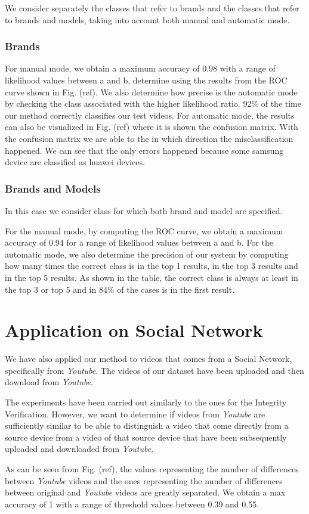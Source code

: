 We consider separately the classes that refer to brands and the classes that refer to brands and models, taking into account both manual and automatic mode.

\subsubsection*{Brands}

For manual mode, we obtain a maximum accuracy of 0.98 with a range of likelihood values between a and b, determine using the results from the ROC curve shown in Fig. (ref).
We also determine how precise is the automatic mode by checking the class associated with the higher likelihood ratio. 92\% of the time our method correctly classifies our test videos. For automatic mode, the results can also be visualized in Fig. (ref) where it is shown the confusion matrix. With the confusion matrix we are able to the in which direction the misclassification happened. We can see that the only errors happened because some samsung device are classified as huawei devices. 

\subsubsection*{Brands and Models}

In this case we consider class for which both brand and model are specified. 

For the manual mode, by computing the ROC curve, we obtain a maximum accuracy of 0.94 for a range of likelihood values between a and b.
For the automatic mode, we also determine the precision of our system by computing how many times the correct class is in the top 1 results, in the top 3 results and in the top 5 results. As shown in the table, the correct class is always at least in the top 3 or top 5 and in 84\% of the cases is in the first result.

\section{Application on Social Network}

We have also applied our method to videos that comes from a Social Network, specifically from \emph{Youtube}. The videos of our dataset have been uploaded and then download from \emph{Youtube}.

The experiments have been carried out similarly to the ones for the Integrity Verification. However, we want to determine if videos from \emph{Youtube} are sufficiently similar to be able to distinguish a video that come directly from a source device from a video of that source device that have been subsequently uploaded and downloaded from \emph{Youtube}.

As can be seen from Fig. (ref), the values representing the number of differences between \emph{Youtube} videos and the ones representing the number of differences between original and \emph{Youtube} videos are greatly separated. We obtain a max accuracy of 1 with a range of threshold values between 0.39 and 0.55.



